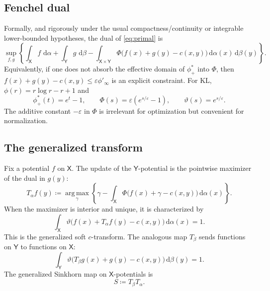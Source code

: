 \documentclass[11pt]{article}
\newcommand{\X}{\mathsf{X}}
\newcommand{\Y}{\mathsf{Y}}
\newcommand{\eps}{\varepsilon}
\newcommand{\dd}{\,\mathrm{d}}
\newcommand{\argmax}{\operatorname*{arg\,max}}
\newcommand{\defeq}{\coloneqq}
\begin{document}
\subsection{Fenchel dual}

Formally, and rigorously under the usual compactness/continuity or integrable
lower-bounded hypotheses, the dual of \eqref{eq:primal} is
\begin{equation}\label{eq:dual}
  \sup_{f,g}
  \left\{
  \int_\X f\,\dd\alpha+
  \int_\Y g\,\dd\beta
  -\int_{\X\times\Y}\Phi\big(f(x)+g(y)-c(x,y)\big)
  \dd\alpha(x)\dd\beta(y)
  \right\}.
\end{equation}
Equivalently, if one does not absorb the effective domain of $\phi_+^*$ into
$\Phi$, then $f(x)+g(y)-c(x,y)\leq \eps\phi'_\infty$ is an explicit constraint.
For KL, $\phi(r)=r\log r-r+1$ and
\begin{equation*}
  \phi_+^*(t)=e^t-1,
  \qquad
  \Phi(s)=\eps(e^{s/\eps}-1),
  \qquad
  \vartheta(s)=e^{s/\eps}.
\end{equation*}
The additive constant $-\eps$ in $\Phi$ is irrelevant for optimization but
convenient for normalization.

\subsection{The generalized transform}

Fix a potential $f$ on $\X$.  The update of the $\Y$-potential is the pointwise
maximizer of the dual in $g(y)$:
\begin{equation}\label{eq:Tdef}
  T_\alpha f(y)
  \defeq
  \argmax_{\gamma}
  \left\{
  \gamma-
  \int_\X \Phi\big(f(x)+\gamma-c(x,y)\big)\dd\alpha(x)
  \right\}.
\end{equation}
When the maximizer is interior and unique, it is characterized by
\begin{equation}\label{eq:implicit}
  \int_\X
  \vartheta\big(f(x)+T_\alpha f(y)-c(x,y)\big)
  \dd\alpha(x)=1.
\end{equation}
This is the generalized soft $c$-transform.  The analogous map
$T_\beta$ sends functions on $\Y$ to functions on $\X$:
\begin{equation}\label{eq:Tbeta}
  \int_\Y
  \vartheta\big(T_\beta g(x)+g(y)-c(x,y)\big)
  \dd\beta(y)=1.
\end{equation}
The generalized Sinkhorn map on $\X$-potentials is
\begin{equation}\label{eq:double}
  S\defeq T_\beta T_\alpha.
\end{equation}
\end{document}

